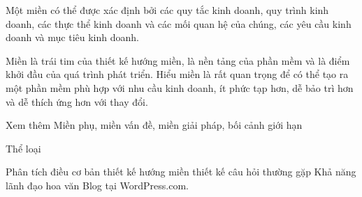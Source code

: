Một miền có thể được xác định bởi các quy tắc kinh doanh, quy trình kinh doanh, các thực thể kinh doanh và các mối quan hệ của chúng, các yêu cầu kinh doanh và mục tiêu kinh doanh.

Miền là trái tim của thiết kế hướng miền, là nền tảng của phần mềm và là điểm khởi đầu của quá trình phát triển. Hiểu miền là rất quan trọng để có thể tạo ra một phần mềm phù hợp với nhu cầu kinh doanh, ít phức tạp hơn, dễ bảo trì hơn và dễ thích ứng hơn với thay đổi.

Xem thêm	 Miền phụ, miền vấn đề, miền giải pháp, bối cảnh giới hạn

Thể loại

Phân tích
điều cơ bản
thiết kế hướng miền
thiết kế
câu hỏi thường gặp
Khả năng lãnh đạo
hoa văn
Blog tại WordPress.com.